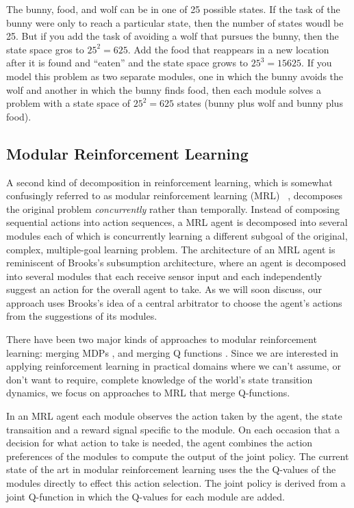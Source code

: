The bunny, food, and wolf can be in one of 25 possible states. If the task of the bunny were only to reach a particular state, then the number of states woudl be 25. But if you add the task of avoiding a wolf that pursues the bunny, then the state space gros to $25^2 = 625$. Add the food that reappears in a new location after it is found and ``eaten'' and the state space grows to $25^3 = 15625$. If you model this problem as two separate modules, one in which the bunny avoids the wolf and another in which the bunny finds food, then each module solves a problem with a state space of $25^2 = 625$ states (bunny plus wolf and bunny plus food).

\subsection{Modular Reinforcement Learning}\label{sec:mrl}

A second kind of decomposition in reinforcement learning, which is somewhat confusingly referred to as modular reinforcement learning (MRL) ~\cite{russell2003q-decomposition,sprague2003multiple-goal}, decomposes the original problem {\it concurrently} rather than temporally. Instead of composing sequential actions into action sequences, a MRL agent is decomposed into several modules each of which is concurrently learning a different subgoal of the original, complex, multiple-goal learning problem. The architecture of an MRL agent is reminiscent of Brooks's subsumption architecture, where an agent is decomposed into several modules that each receive sensor input and each independently suggest an action for the overall agent to take. As we will soon discuss, our approach uses Brooks's idea of a central arbitrator to choose the agent's actions from the suggestions of its modules.

There have been two major kinds of approaches to modular reinforcement learning: merging MDPs \cite{singh1998how-to-dynamically}, and merging Q functions \cite{sprague2003multiple-goal,russell2003q-decomposition}. Since we are interested in applying reinforcement learning in practical domains where we can't assume, or don't want to require, complete knowledge of the world's state transition dynamics, we focus on approaches to MRL that merge Q-functions.

In an MRL agent each module observes the action taken by the agent, the state transaition and a reward signal specific to the module. On each occasion that a decision for what action to take is needed, the agent combines the action preferences of the modules to compute the output of the joint policy.  The current state of the art in modular reinforcement learning uses the the Q-values of the modules directly to effect this action selection. The joint policy is derived from a joint Q-function in which the Q-values for each module are added.

